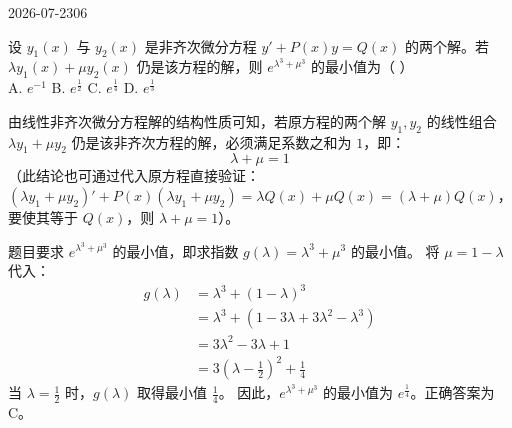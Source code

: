 \begin{mistake}{2026-07-23}{06}

\begin{problemcontent}
设 \(y_1(x)\) 与 \(y_2(x)\) 是非齐次微分方程 \(y' + P(x)y = Q(x)\) 的两个解。若 \(\lambda y_1(x) + \mu y_2(x)\) 仍是该方程的解，则 \(e^{\lambda^3 + \mu^3}\) 的最小值为（ ）\\
A. \(e^{-1}\) \quad B. \(e^{\frac{1}{2}}\) \quad C. \(e^{\frac{1}{4}}\) \quad D. \(e^{\frac{1}{3}}\)
\end{problemcontent}

\begin{solutioncontent}
由线性非齐次微分方程解的结构性质可知，若原方程的两个解 \(y_1, y_2\) 的线性组合 \(\lambda y_1 + \mu y_2\) 仍是该非齐次方程的解，必须满足系数之和为 \(1\)，即：
\[\lambda + \mu = 1\]
（此结论也可通过代入原方程直接验证：\((\lambda y_1 + \mu y_2)' + P(x)(\lambda y_1 + \mu y_2) = \lambda Q(x) + \mu Q(x) = (\lambda+\mu)Q(x)\)，要使其等于 \(Q(x)\)，则 \(\lambda+\mu=1\)）。

题目要求 \(e^{\lambda^3 + \mu^3}\) 的最小值，即求指数 \(g(\lambda) = \lambda^3 + \mu^3\) 的最小值。
将 \(\mu = 1 - \lambda\) 代入：
\[
\begin{aligned}
g(\lambda) &= \lambda^3 + (1 - \lambda)^3 \\
&= \lambda^3 + (1 - 3\lambda + 3\lambda^2 - \lambda^3) \\
&= 3\lambda^2 - 3\lambda + 1 \\
&= 3\left(\lambda - \frac{1}{2}\right)^2 + \frac{1}{4}
\end{aligned}
\]
当 \(\lambda = \frac{1}{2}\) 时，\(g(\lambda)\) 取得最小值 \(\frac{1}{4}\)。
因此，\(e^{\lambda^3 + \mu^3}\) 的最小值为 \(e^{\frac{1}{4}}\)。正确答案为 C。
\end{solutioncontent}


\end{mistake}

